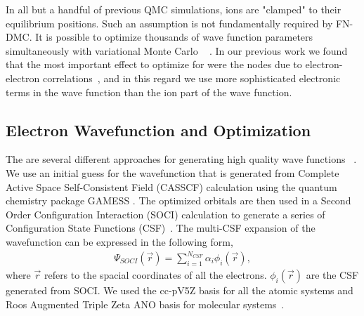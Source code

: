 \documentclass[pra,superscriptaddress,groupedaddress,twocolumn]{revtex4}
\begin{document}
In all but a handful of previous QMC simulations,  ions are "clamped" to their equilibrium positions. Such an assumption is not fundamentally required by FN-DMC.  It is possible to optimize thousands of wave function parameters simultaneously with variational Monte Carlo ~\cite{Nightingale_Linear,Umrigar_Linear,Brown_Bench} .   In our previous work we found that the most important effect to optimize for were the nodes due to electron-electron correlations~\cite{Tubman_ECG}, and in this regard we use more sophisticated electronic terms in the wave function than the ion part of the wave function.  %

\subsection{Electron Wavefunction and Optimization}
The are several different approaches for generating high quality wave functions ~\cite{Umrigar_Alleviation,Toulouse_Bench, Brown_Bench,Seth_Bench}. We use an initial guess for the wavefunction that is generated from Complete Active Space Self-Consistent Field (CASSCF) \cite{Chaban_MCSCF,Szabo} calculation using the quantum chemistry package GAMESS \cite{GAMESS}. The optimized orbitals are then used in a Second Order Configuration Interaction (SOCI) calculation to generate a series of Configuration State Functions (CSF)~\cite{Clark_Bench}. The multi-CSF expansion of the wavefunction  can be expressed in the following form,
\begin{align}
\Psi_{SOCI}(\vec{r})=\sum\limits_{i=1}^{N_{CSF}}\alpha_i\phi_i(\vec{r}), \label{eq:psi_gms}
\end{align}
where $\vec{r}$ refers to the spacial coordinates of all the electrons. $\phi_i(\vec{r})$ are the CSF generated from SOCI. We used the cc-pV5Z basis for all the atomic systems and Roos Augmented Triple Zeta ANO basis for molecular systems~\cite{cc,roos,BSE}. %
\end{document}
